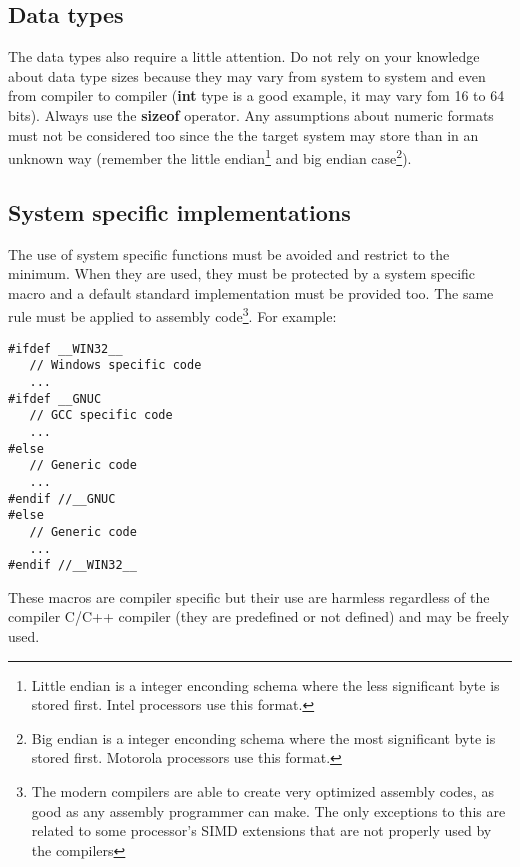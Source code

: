 \subsection{Data types}
\label{sec:coding.dataencoding}

The data types also require a little attention. Do not rely on your knowledge about data type sizes because they may vary from system to system and even from compiler to compiler ({\bf int} type is a good example, it may vary fom 16 to 64 bits). Always use the {\bf sizeof} operator. Any assumptions about numeric formats must not be considered too since the the target system may store than in an unknown way (remember the little endian\footnote{Little endian is a integer enconding schema where the less significant byte is stored first. Intel processors use this format.} and big endian case\footnote{Big endian is a integer enconding schema where the most significant byte is stored first. Motorola processors use this format.}).

\subsection{System specific implementations}
\label{sec:coding.system}

The use of system specific functions must be avoided and restrict to the minimum. When they are used, they must be protected by a system specific macro and a default standard implementation must be provided too. The same rule must be applied to assembly code\footnote{The modern compilers are able to create very optimized assembly codes, as good as any assembly programmer can make. The only exceptions to this are related to some processor's SIMD extensions that are not properly used by the compilers}. For example:

\begin{code}
\begin{verbatim}
#ifdef __WIN32__
   // Windows specific code
   ...
#ifdef __GNUC
   // GCC specific code
   ...
#else
   // Generic code
   ...
#endif //__GNUC
#else
   // Generic code
   ...
#endif //__WIN32__
\end{verbatim}
\end{code}

These macros are compiler specific but their use are harmless regardless of the compiler C/C++ compiler (they are predefined or not defined) and may be freely used.

